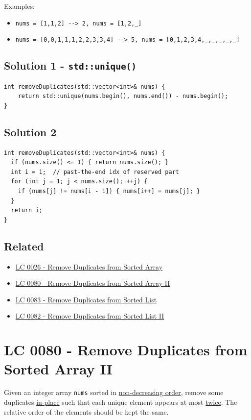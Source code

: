Examples:
\begin{itemize}
	\item {\colorbox{CodeBackground}{\lstinline|nums = [1,1,2] --> 2, nums = [1,2,_]|}}
	\item {\colorbox{CodeBackground}{\lstinline|nums = [0,0,1,1,1,2,2,3,3,4] --> 5, nums = [0,1,2,3,4,_,_,_,_,_]|}}
\end{itemize}

\subsection*{Solution 1 - {\colorbox{CodeBackground}{\lstinline|std::unique()|}}}
\begin{lstlisting}
int removeDuplicates(std::vector<int>& nums) {
	return std::unique(nums.begin(), nums.end()) - nums.begin();
}
\end{lstlisting}

\subsection*{Solution 2}
\begin{lstlisting}
int removeDuplicates(std::vector<int>& nums) {
  if (nums.size() <= 1) { return nums.size(); }
  int i = 1;  // past-the-end idx of reserved part
  for (int j = 1; j < nums.size(); ++j) {
    if (nums[j] != nums[i - 1]) { nums[i++] = nums[j]; }
  }
  return i;
}

\end{lstlisting}

\subsection*{Related}
\begin{itemize}
	\item \hyperref[lc0026]{LC 0026 - Remove Duplicates from Sorted Array}
	\item \hyperref[lc0080]{LC 0080 - Remove Duplicates from Sorted Array II}
	\item \hyperref[lc0083]{LC 0083 - Remove Duplicates from Sorted List}
	\item \hyperref[lc0082]{LC 0082 - Remove Duplicates from Sorted List II}
\end{itemize}

\section{LC 0080 - Remove Duplicates from Sorted Array II}\label{lc0080}
Given an integer array {\colorbox{CodeBackground}{\lstinline|nums|}} sorted in \ul{non-decreasing order}, remove some duplicates \ul{in-place} such that each unique element appears at most \ul{twice}. The relative order of the elements should be kept the same.\\

